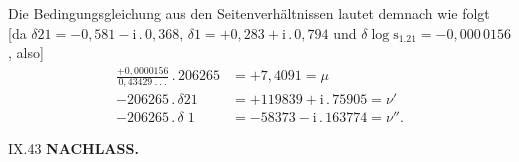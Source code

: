 Die Bedingungsgleichung aus den Seitenverhältnissen lautet demnach wie folgt [da \(\delta21=-0{,}581-\mathrm{i}\,.\,0{,}368\), \(\delta1=+0{,}283+\mathrm{i}\,.\,0{,}794\) und \(\delta\log\mathrm{s}_{1.21}=-0{,}000\,0156\), also]
\[
\begin{aligned}
\frac{+0{,}0000156}{0{,}43429\ .\ .\ .}\,.\,206265&=+7{,}4091=\mu\\[4pt]
-206265\,.\,\delta21&=+119839+\mathrm{i}\,.\,75905=\nu'\\[4pt]
-206265\,.\,\delta\;1&=-58373-\mathrm{i}\,.\,163774=\nu''.
\end{aligned}
\]
\endgroup
\par\vfill\noindent\small IX.\hfill43\normalsize
\clearpage
{}\hfill\textbf{NACHLASS.}\par\medskip
\begingroup
\small\setlength{\tabcolsep}{5pt}\renewcommand{\arraystretch}{1.18}

